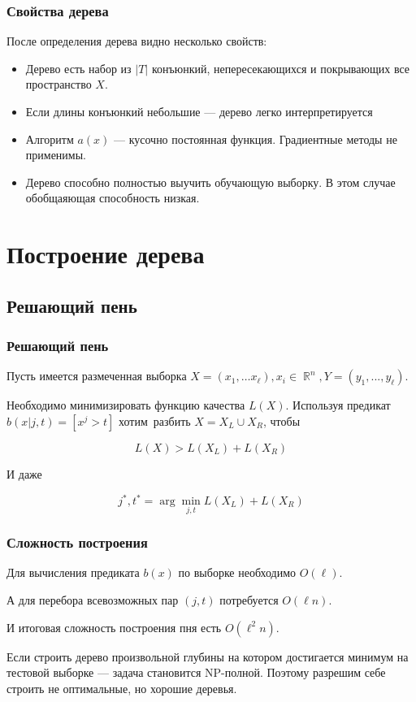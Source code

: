 \documentclass{beamer}
\DeclareMathOperator{\R}{\mathbb{R}}
\begin{document}
	\begin{frame}
		\frametitle{Свойства дерева}
		
		После определения дерева видно несколько свойств:
		\begin{itemize}
			\item Дерево есть набор из $|T|$ конъюнкий, непересекающихся и покрывающих все пространство $X$.
			\item Если длины конъюнкий небольшие --- дерево легко интерпретируется
			\item Алгоритм $a(x)$ --- кусочно постоянная функция. Градиентные методы не применимы.
			\item Дерево способно полностью выучить обучающую выборку. В этом случае обобщаяющая способность низкая.
		\end{itemize}
	\end{frame}

	\section{Построение дерева}

	\subsection{Решающий пень}

	\begin{frame}
		\frametitle{Решающий пень}
		Пусть имеется размеченная выборка $X = (x_1, \dots x_{\ell}), x_i \in \R^n, Y = (y_1, ..., y_{\ell})$.

		\vspace{15pt}
  
		Необходимо минимизировать функцию качества $L(X)$.
		Используя предикат $b(x| j, t) = [x^j > t]$ хотим~разбить $X = X_L \cup X_R$, чтобы

		\[
		L(X) > L(X_L) + L(X_R)
		\]

		И даже 

		\[
		j^*, t^* = \arg \min_{j, t} L(X_L) + L(X_R)
		\]
	\end{frame}

	\begin{frame}
		\frametitle{Сложность построения}

		Для вычисления предиката $b(x)$ по выборке необходимо $O(\ell)$.

		А для перебора всевозможных пар $(j, t)$ потребуется $O(\ell n)$.

		И итоговая сложность построения пня есть $O(\ell^2 n)$.

		\vspace{15pt}

		Если строить дерево произвольной глубины на котором достигается минимум на тестовой выборке 
		--- задача становится NP-полной.
		Поэтому разрешим себе строить не оптимальные, но хорошие деревья.
	\end{frame}
\end{document}
